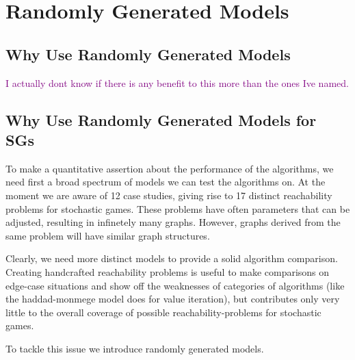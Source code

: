 \chapter{Randomly Generated Models} \label{ch:randomGen}
\section{Why Use Randomly Generated Models}
\textcolor{purple}{I actually dont know if there is any benefit to this more than the ones Ive named.}

\section{Why Use Randomly Generated Models for SGs}
To make a quantitative assertion about the performance of the algorithms, we need first a broad spectrum of models we can test the algorithms on. At the moment we are aware of 12 case studies, giving rise to 17 distinct reachability problems for stochastic games. These problems have often parameters that can be adjusted, resulting in infinetely many graphs. However, graphs derived from the same problem will have similar graph structures.

Clearly, we need more distinct models to provide a solid algorithm comparison. Creating handcrafted reachability problems is useful to make comparisons on edge-case situations and show off the weaknesses of categories of algorithms (like the haddad-monmege model does for value iteration), but contributes only very little to the overall coverage of possible reachability-problems for stochastic games.

To tackle this issue we introduce randomly generated models.


